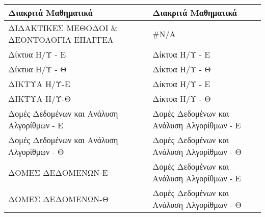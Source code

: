 \documentclass[12pt,a4paper,final]{article}
\begin{document}
\begin{landscape}
\begin{center}
\begin{longtable}{|l|l|}
\hline
Διακριτά Μαθηματικά                                                                                             & Διακριτά Μαθηματικά                                                                                                  \\ 
\hline
ΔΙΔΑΚΤΙΚΕΣ ΜΕΘΟΔΟΙ \& ΔΕΟΝΤΟΛΟΓΙΑ ΕΠΑΓΓΕΛ                                                                       & \#N/A                                                                                                                \\ 
\hline
Δίκτυα Η/Υ - Ε                                                                                                  & Δίκτυα Η/Υ - Ε                                                                                                       \\ 
\hline
Δίκτυα Η/Υ - Θ                                                                                                  & Δίκτυα Η/Υ - Θ                                                                                                       \\ 
\hline
ΔΙΚΤΥΑ Η/Υ-Ε                                                                                                    & Δίκτυα Η/Υ - Ε                                                                                                       \\ 
\hline
ΔΙΚΤΥΑ Η/Υ-Θ                                                                                                    & Δίκτυα Η/Υ - Θ                                                                                                       \\ 
\hline
Δομές Δεδομένων και Ανάλυση Αλγορίθμων - Ε                                                                      & Δομές Δεδομένων και Ανάλυση Αλγορίθμων - Ε                                                                           \\ 
\hline
Δομές Δεδομένων και Ανάλυση Αλγορίθμων - Θ                                                                      & Δομές Δεδομένων και Ανάλυση Αλγορίθμων - Θ                                                                           \\ 
\hline
ΔΟΜΕΣ ΔΕΔΟΜΕΝΩΝ-Ε                                                                                               & Δομές Δεδομένων και Ανάλυση Αλγορίθμων - Ε                                                                           \\ 
\hline
ΔΟΜΕΣ ΔΕΔΟΜΕΝΩΝ-Θ                                                                                               & Δομές Δεδομένων και Ανάλυση Αλγορίθμων - Θ                                                                           \\ 

\end{longtable}
\end{center}
\end{landscape}
\end{document}
